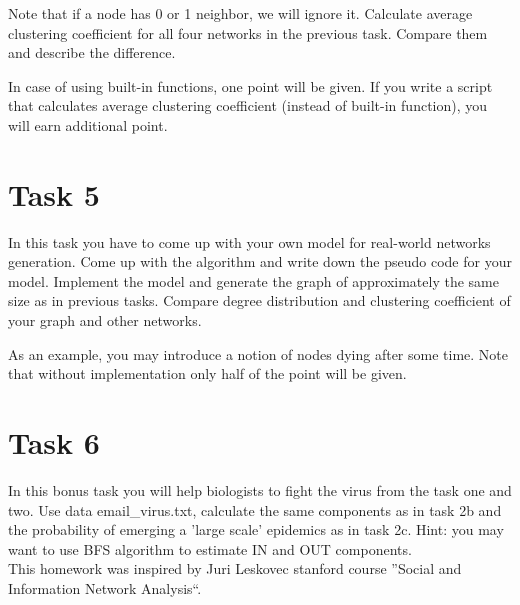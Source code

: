 \documentclass{article}
\begin{document}
Note that if a node has 0 or 1 neighbor, we will ignore it.
Calculate average clustering coefficient for all four networks in the previous task. Compare them and describe the difference. 

In case of using built-in functions, one point will be given. If you write a script that calculates average clustering coefficient (instead of built-in function), you will earn additional point.

\section*{Task 5}
In this task you have to come up with your own model for real-world networks generation. Come up with the algorithm and write down the pseudo code for your model. Implement the model and generate the graph of approximately the same size as in previous tasks. Compare degree distribution and clustering coefficient of your graph and other networks.

As an example, you may introduce a notion of nodes dying after some time.
Note that without implementation only half of the point will be given.

\section*{Task 6}
In this bonus task you will help biologists to fight the virus from the task one and two. Use data email\_virus.txt, calculate the same components as in task 2b and the probability of emerging a 'large scale' epidemics as in task 2c. Hint: you may want to use BFS algorithm to estimate IN and OUT components.
\medskip
\\
This homework was inspired by Juri Leskovec stanford course ''Social and Information Network Analysis``. 
\end{document}
